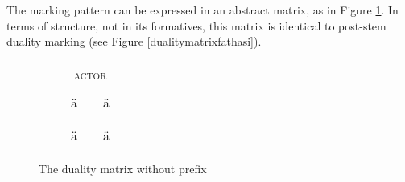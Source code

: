 The marking pattern can be expressed in an abstract matrix, as in Figure \ref{raezerorae}. In terms of structure, not in its formatives, this matrix is identical to post-stem duality marking (see Figure \ref{dualitymatrixfathasi}).

\begin{figure}
	\begin{tabular}{|ccccccc|}
		\cline{3-5}
		\multicolumn{2}{c|}{}&\multicolumn{3}{c|}{\textsc{actor}}&\\\cline{3-5}
		\multicolumn{2}{c|}{}&\multicolumn{1}{c}{\Sg}&\multicolumn{1}{|c|}{\Du}&\multicolumn{1}{c|}{\Pl}&\\\cline{1-5}
		{\parbox[t]{2mm}{}}&\multicolumn{1}{|c|}{\parbox[t]{2mm}{}}&\multicolumn{1}{c}{\multirow{2}{*}{\hspace{0,1cm}ä\hspace{0,1cm}}}&\multirow{2}{*}{\hspace{0,1cm}\Zero{}\hspace{0,1cm}}	&\multicolumn{1}{c|}{\multirow{2}{*}{\hspace{0,1cm}ä{\hspace{0,1cm}}}}&\\
		&\multicolumn{1}{|c|}{}&&&\multicolumn{1}{c|}{}\\\cline{2-2}
		&\multicolumn{1}{|c|}{\parbox[t]{2mm}{}}&\multicolumn{1}{c}{\multirow{2}{*}{\hspace{0,1cm}\Zero{}\hspace{0,1cm}}}&\multirow{2}{*}{\hspace{0,1cm}\Zero{}\hspace{0,1cm}}&\multicolumn{1}{c|}{\multirow{2}{*}{\hspace{0,1cm}\Zero{}\hspace{0,1cm}}}&\\
		&\multicolumn{1}{|c|}{}&&&\multicolumn{1}{c|}{}\\\cline{2-2}
		&\multicolumn{1}{|c|}{\parbox[t]{2mm}{}}&\multicolumn{1}{c}{\multirow{2}{*}{\hspace{0,1cm}ä\hspace{0,1cm}}}&\multirow{2}{*}{\hspace{0,1cm}\Zero{}\hspace{0,1cm}}&\multicolumn{1}{c|}{\multirow{2}{*}{\hspace{0,1cm}ä\hspace{0,1cm}}}&\\
		&\multicolumn{1}{|c|}{}&&&\multicolumn{1}{c|}{}\\\cline{1-5}
	\end{tabular}
\caption{The duality matrix without {\Vc} prefix}
\label{raezerorae}
\end{figure}%


